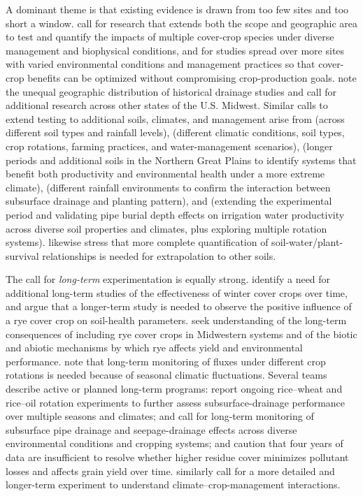 \documentclass[11pt]{article}
\begin{document}
A dominant theme is that existing evidence is drawn from too few sites and too short a window. \textcite{Birru2023} call for research that extends both the scope and geographic area to test and quantify the impacts of multiple cover-crop species under diverse management and biophysical conditions, and for studies spread over more sites with varied environmental conditions and management practices so that cover-crop benefits can be optimized without compromising crop-production goals. \textcite{Zhao2016} note the unequal geographic distribution of historical drainage studies and call for additional research across other states of the U.S. Midwest. Similar calls to extend testing to additional soils, climates, and management arise from \textcite{Grewal2025} (across different soil types and rainfall levels), \textcite{Negm2014} (different climatic conditions, soil types, crop rotations, farming practices, and water-management scenarios), \textcite{Saha2024} (longer periods and additional soils in the Northern Great Plains to identify systems that benefit both productivity and environmental health under a more extreme climate), \textcite{Takeshima2023} (different rainfall environments to confirm the interaction between subsurface drainage and planting pattern), and \textcite{Liu2025} (extending the experimental period and validating pipe burial depth effects on irrigation water productivity across diverse soil properties and climates, plus exploring multiple rotation systems). \textcite{BENOIT1967} likewise stress that more complete quantification of soil-water/plant-survival relationships is needed for extrapolation to other soils.

The call for \emph{long-term} experimentation is equally strong. \textcite{Kaspar2012} identify a need for additional long-term studies of the effectiveness of winter cover crops over time, and \textcite{Bawa2023} argue that a longer-term study is needed to observe the positive influence of a rye cover crop on soil-health parameters. \textcite{MartinezFeria2016} seek understanding of the long-term consequences of including rye cover crops in Midwestern systems and of the biotic and abiotic mechanisms by which rye affects yield and environmental performance. \textcite{Kumar2014b} note that long-term monitoring of fluxes under different crop rotations is needed because of seasonal climatic fluctuations. Several teams describe active or planned long-term programs: \textcite{Qi2025b} report ongoing rice--wheat and rice--oil rotation experiments to further assess subsurface-drainage performance over multiple seasons and climates; \textcite{Liu2025b} and \textcite{Liu2025c} call for long-term monitoring of subsurface pipe drainage and seepage-drainage effects across diverse environmental conditions and cropping systems; and \textcite{Thoma2005} caution that four years of data are insufficient to resolve whether higher residue cover minimizes pollutant losses and affects grain yield over time. \textcite{Acharya2019b} similarly call for a more detailed and longer-term experiment to understand climate--crop-management interactions.
\end{document}
